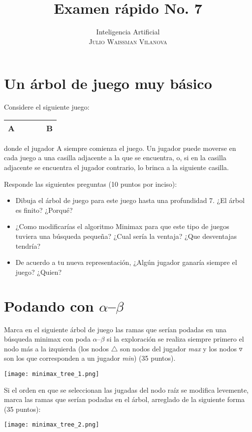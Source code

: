 \documentclass[onecolumn, letter, 11pt]{article}
\title{Examen rápido No. 7}
\author{Inteligencia Artificial\\ \textsc{Julio Waissman Vilanova}}
\date{}
\begin{document}
\maketitle

\section*{Un árbol de juego muy básico}

Considere el siguiente juego:

\begin{center}
\begin{tabular}{|c|c|c|c|c|}
\hline
A& & & &B\\
\hline
\end{tabular}
\end{center}
donde el jugador A siempre comienza el juego. Un jugador puede moverse
en cada juego a una casilla adjacente a la que se encuentra, o, si en
la casilla adjacente se encuentra el jugador contrario, lo brinca a la
siguiente casilla.

Responde las siguientes preguntas (10 puntos por inciso):
\begin{itemize}
\item Dibuja el árbol de juego para este juego hasta una profundidad 7. ¿El árbol es finito?
  ¿Porqué?
\item ¿Como modificarías el algoritmo Minimax para que este tipo de
  juegos tuviera una búsqueda pequeña? ¿Cual sería la ventaja? ¿Que
  desventajas tendría?
\item De acuerdo a tu nueva representación, ¿Algún jugador ganaría
  siempre el juego? ¿Quien?
\end{itemize}

\newpage

\section*{Podando con $\alpha$--$\beta$}
Marca en el siguiente árbol de juego las ramas que serían podadas en una búsqueda minimax
con poda $\alpha$--$\beta$ si la exploración se realiza siempre primero el nodo más a la
izquierda (los nodos $\triangle$ son nodos del jugador \emph{max} y los nodos
$\triangledown$ son los que corresponden a un jugador \emph{min}) (35 puntos).

\begin{center}
  \texttt{[image: minimax\_tree\_1.png]}
\end{center}

Si el orden en que se seleccionan las jugadas del nodo raíz se modifica levemente, marca las ramas
que serían podadas en el árbol, arreglado de la siguiente forma (35 puntos):

\begin{center}
  \texttt{[image: minimax\_tree\_2.png]}
\end{center}
\end{document}
